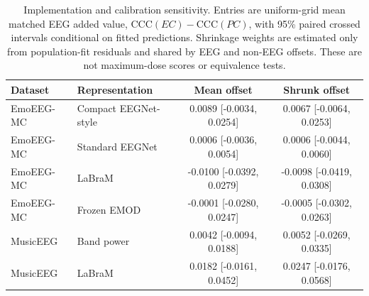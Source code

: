 \begin{table}[t]
\centering\small
\caption{Implementation and calibration sensitivity. Entries are uniform-grid mean matched EEG added value, $\mathrm{CCC}(EC)-\mathrm{CCC}(PC)$, with 95\% paired crossed intervals conditional on fitted predictions. Shrinkage weights are estimated only from population-fit residuals and shared by EEG and non-EEG offsets. These are not maximum-dose scores or equivalence tests.}
\label{tab:v3-calibration}
\begin{tabular}{@{}llcc@{}}
\toprule
Dataset & Representation & Mean offset & Shrunk offset \\
\midrule
EmoEEG-MC & Compact EEGNet-style & 0.0089 [-0.0034, 0.0254] & 0.0067 [-0.0064, 0.0253] \\
EmoEEG-MC & Standard EEGNet & 0.0006 [-0.0036, 0.0054] & 0.0006 [-0.0044, 0.0060] \\
EmoEEG-MC & LaBraM & -0.0100 [-0.0392, 0.0279] & -0.0098 [-0.0419, 0.0308] \\
EmoEEG-MC & Frozen EMOD & -0.0001 [-0.0280, 0.0247] & -0.0005 [-0.0302, 0.0263] \\
MusicEEG & Band power & 0.0042 [-0.0094, 0.0188] & 0.0052 [-0.0269, 0.0335] \\
MusicEEG & LaBraM & 0.0182 [-0.0161, 0.0452] & 0.0247 [-0.0176, 0.0568] \\
\bottomrule
\end{tabular}
\end{table}
